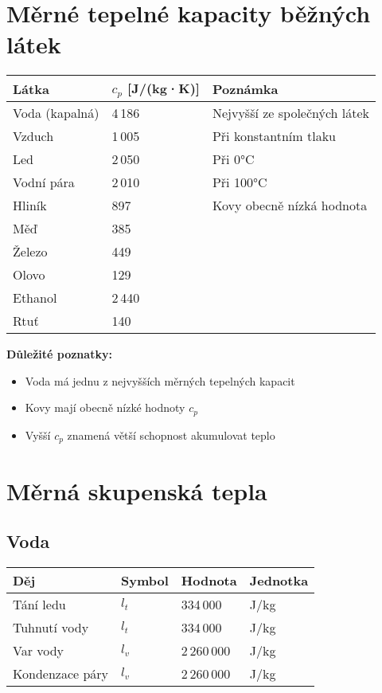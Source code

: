 \documentclass[11pt,a4paper]{article}
\begin{document}
\section{Měrné tepelné kapacity běžných látek}

\begin{longtable}{lll}
\toprule
Látka & $c_p$ [J/(kg·K)] & Poznámka \\
\midrule
Voda (kapalná) & 4\,186 & Nejvyšší ze společných látek \\
Vzduch & 1\,005 & Při konstantním tlaku \\
Led & 2\,050 & Při 0°C \\
Vodní pára & 2\,010 & Při 100°C \\
Hliník & 897 & Kovy obecně nízká hodnota \\
Měď & 385 & \\
Železo & 449 & \\
Olovo & 129 & \\
Ethanol & 2\,440 & \\
Rtuť & 140 & \\
\bottomrule
\end{longtable}

\textbf{Důležité poznatky:}
\begin{itemize}
\item Voda má jednu z nejvyšších měrných tepelných kapacit
\item Kovy mají obecně nízké hodnoty $c_p$
\item Vyšší $c_p$ znamená větší schopnost akumulovat teplo
\end{itemize}

\clearpage

\section{Měrná skupenská tepla}

\subsection{Voda}

\begin{longtable}{llll}
\toprule
Děj & Symbol & Hodnota & Jednotka \\
\midrule
Tání ledu & $l_t$ & 334\,000 & J/kg \\
Tuhnutí vody & $l_t$ & 334\,000 & J/kg \\
Var vody & $l_v$ & 2\,260\,000 & J/kg \\
Kondenzace páry & $l_v$ & 2\,260\,000 & J/kg \\
\bottomrule
\end{longtable}
\end{document}
